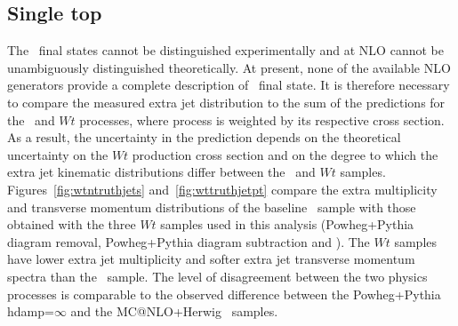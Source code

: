 \subsection{Single top}
\label{app:truthwt}
The \ttbar\ final states cannot be distinguished experimentally and at NLO cannot be unambiguously 
distinguished theoretically.  At present, none of the available NLO generators provide a complete description of
\emubb\  final state.  It is therefore necessary to compare the measured extra jet distribution to the
sum of the predictions for the \ttbar\ and $Wt$ processes, where process is weighted by its respective cross section.
As a result, the uncertainty in the prediction depends on the theoretical uncertainty on the $Wt$ production cross section
and on the degree to which the extra jet kinematic distributions differ between the \ttbar\ and $Wt$ samples.
Figures~\ref{fig:wtntruthjets} and~\ref{fig:wttruthjetpt} compare the extra multiplicity and transverse momentum
distributions of the baseline \ttbar\ sample with those obtained with the three $Wt$ samples used in this analysis 
({\sc Powheg+Pythia} diagram removal, {\sc Powheg+Pythia} diagram subtraction and \mcnlohw).  The $Wt$ samples have
lower extra jet multiplicity and softer extra jet transverse momentum spectra than the \ttbar\ sample.  The level
of disagreement between the two physics processes is comparable to the observed difference between 
the {\sc Powheg+Pythia} hdamp=$\infty$ and the {\sc MC@NLO+Herwig} \ttbar\ samples.

